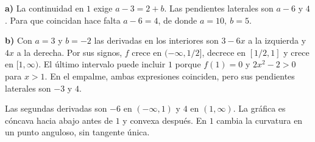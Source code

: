 \textbf{a)} La continuidad en $1$ exige $a-3=2+b$.
Las pendientes laterales son $a-6$ y $4$. Para que coincidan
hace falta $a-6=4$, de donde $\boxed{a=10,\ b=5}$.

\textbf{b)} Con $a=3$ y $b=-2$ las derivadas en los interiores
son $3-6x$ a la izquierda y $4x$ a la derecha. Por sus signos,
$f$ crece en $(-\infty,1/2]$, decrece en $[1/2,1]$ y crece
en $[1,\infty)$. El último intervalo puede incluir $1$ porque
$f(1)=0$ y $2x^2-2>0$ para $x>1$. En el empalme, ambas expresiones
coinciden, pero sus pendientes laterales son $-3$ y $4$.

Las segundas derivadas son $-6$ en $(-\infty,1)$ y $4$ en $(1,\infty)$.
La gráfica es cóncava hacia abajo antes de $1$ y convexa después.
En $1$ cambia la curvatura en un punto anguloso, sin tangente única.
